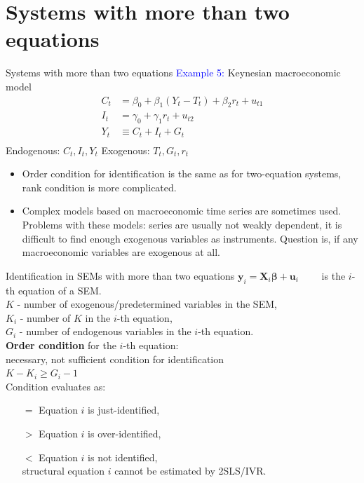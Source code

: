 \documentclass[usenames,dvipsnames]{beamer}
\begin{document}
\section{Systems with more than two equations}
\begin{frame}{Systems with more than two equations}
\textcolor{Blue}{Example 5:} Keynesian macroeconomic model
\vspace{0.2cm}
\begin{align*}
C_t & = \beta_0 + \beta_1(Y_t - T_t) + \beta_2 r_t + u_{t1} \\
I_t & = \gamma_0 + \gamma_1 r_t + u_{t2} \\
Y_t & \equiv C_t + I_t + G_t \\
\end{align*}
\vspace{-0.2cm}
\noindent Endogenous: $C_t, I_t, Y_t$ \hfill Exogenous: $T_t, G_t, r_t $ \\ 
\medskip
\begin{itemize}
\item Order condition for identification is the same as for two-equation systems, rank condition is more complicated. 
\item Complex models based on macroeconomic time series are sometimes used. Problems with these models: series are usually not weakly dependent, it is difficult to find enough exogenous variables as instruments. Question is, if any macroeconomic variables are exogenous at all.
\end{itemize}
\end{frame}
\begin{frame}{Identification in SEMs with more than two equations}
$\bm{y}_i = \bm{X}_i \bm{\beta}  + \bm{u}_i \qquad$ is the $i$-th equation of a SEM.\\
\medskip
$K$ - number of exogenous/predetermined variables in the SEM,\\ 
$K_i$ - number of $K$ in the $i$-th equation,\\
$G_i$ - number of endogenous variables in the $i$-th equation.\\
\bigskip
\textbf{Order condition} for the $i$-th equation:\\
necessary, not sufficient condition for identification\\
\bigskip
$K-K_i \geq G_i -1$\\
\bigskip
Condition evaluates as:
\begin{itemize}
\item[$=$] Equation $i$ is just-identified,
\item[$>$] Equation $i$ is over-identified,
\item[$<$] Equation $i$ is  not identified,\\
structural equation $i$ cannot be estimated by 2SLS/IVR.
\end{itemize}
\end{frame}
\end{document}
